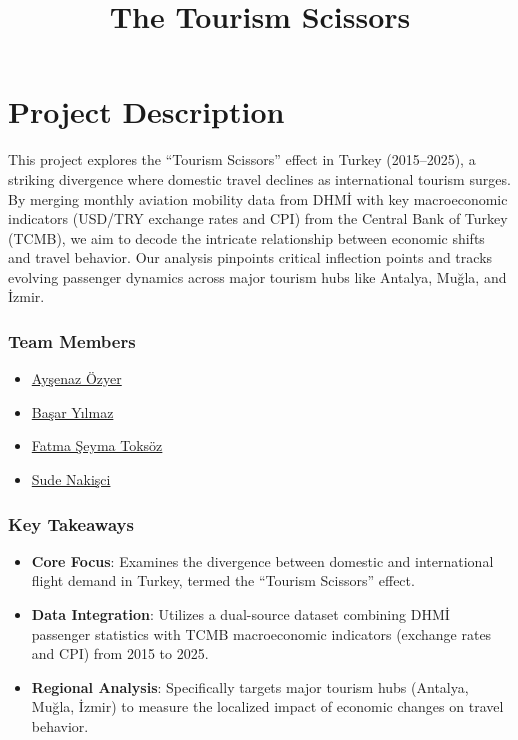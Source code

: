 \documentclass[
  11pt,
  a4paper,
  DIV=11,
  numbers=noendperiod]{scrartcl}
\title{The Tourism Scissors}
\author{}
\date{}
\providecommand{\tightlist}{%
  \setlength{\itemsep}{0pt}\setlength{\parskip}{0pt}}
\begin{document}
\maketitle


\section{Project Description}\label{project-description}

This project explores the ``Tourism Scissors'' effect in Turkey
(2015--2025), a striking divergence where domestic travel declines as
international tourism surges. By merging monthly aviation mobility data
from DHMİ with key macroeconomic indicators (USD/TRY exchange rates and
CPI) from the Central Bank of Turkey (TCMB), we aim to decode the
intricate relationship between economic shifts and travel behavior. Our
analysis pinpoints critical inflection points and tracks evolving
passenger dynamics across major tourism hubs like Antalya, Muğla, and
İzmir.

\subsubsection{Team Members}\label{team-members}

\begin{itemize}
\tightlist
\item
  \href{https://emu-hacettepe-analytics.github.io/emu430-spring2026-aysenazozyer/}{Ayşenaz
  Özyer}
\item
  \href{https://emu-hacettepe-analytics.github.io/emu430-spring2026-BasarYiilmaz/}{Başar
  Yılmaz}
\item
  \href{https://emu-hacettepe-analytics.github.io/emu430-spring2026-b2220469019/}{Fatma
  Şeyma Toksöz}
\item
  \href{https://emu-hacettepe-analytics.github.io/emu430-spring2026-sudenakisci/}{Sude
  Nakişci}
\end{itemize}

\subsubsection{Key Takeaways}\label{key-takeaways}

\begin{itemize}
\item
  \textbf{Core Focus}: Examines the divergence between domestic and
  international flight demand in Turkey, termed the ``Tourism Scissors''
  effect.
\item
  \textbf{Data Integration}: Utilizes a dual-source dataset combining
  DHMİ passenger statistics with TCMB macroeconomic indicators (exchange
  rates and CPI) from 2015 to 2025.
\item
  \textbf{Regional Analysis}: Specifically targets major tourism hubs
  (Antalya, Muğla, İzmir) to measure the localized impact of economic
  changes on travel behavior.
\end{itemize}
\end{document}
